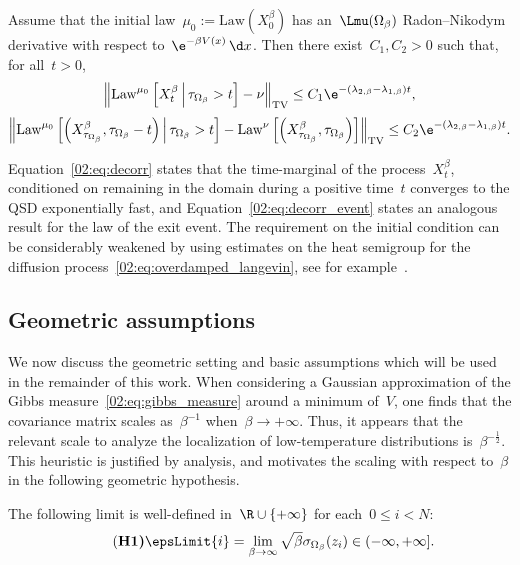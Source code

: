     \begin{proposition}
        \label{02:prop:decorr}
        Assume that the initial law~$\mu_0 := \mathrm{Law}(X^\beta_0)$ has an~$\Lmu(\Omega_\beta)$ Radon--Nikodym derivative with respect to~$\e^{-\beta V(x)}\,\d x$. Then there exist~$C_1,C_2>0$ such that, for all~$t>0$,
        \begin{equation}
            \label{02:eq:decorr}
            \left\|\mathrm{Law}^{\mu_0}\left[X_t^\beta\,\middle|\,\tau_{\Omega_\beta}>t\right] -\nu\right\|_{\mathrm{TV}} \leq C_1 \e^{-(\lambda_{2,\beta}-\lambda_{1,\beta})t},
        \end{equation}
        \begin{equation}
            \label{02:eq:decorr_event}
            \left\|\mathrm{Law}^{\mu_0}\left[\left(X^\beta_{\tau_{\Omega_\beta}},\tau_{\Omega_{\beta}}-t\right)\,\middle|\,\tau_{\Omega_\beta}>t\right] -\mathrm{Law}^\nu\left[\left(X^\beta_{\tau_{\Omega_\beta}},\tau_{\Omega_\beta}\right)\right]\right\|_{\mathrm{TV}} \leq C_2 \e^{-(\lambda_{2,\beta}-\lambda_{1,\beta})t}.
        \end{equation}
    \end{proposition}
    Equation~\eqref{02:eq:decorr} states that the time-marginal of the process~$X_t^\beta$, conditioned on remaining in the domain during a positive time~$t$ converges to the QSD exponentially fast, and Equation~\eqref{02:eq:decorr_event} states an analogous result for the law of the exit event.
    The requirement on the initial condition can be considerably weakened by using estimates on the heat semigroup for the diffusion process~\eqref{02:eq:overdamped_langevin}, see for example~\cite{SL13}.    
    \subsection{Geometric assumptions}
    \label{02:subsec:geometric_assumptions}
    We now discuss the geometric setting and basic assumptions which will be used in the remainder of this work.
    When considering a Gaussian approximation of the Gibbs measure~\eqref{02:eq:gibbs_measure} around a minimum of~$V$, one finds that the covariance matrix scales as~$\beta^{-1}$ when~$\beta\to+\infty$. Thus, it appears that the relevant scale to analyze the localization of low-temperature distributions is~$\beta^{-\frac 12}$.
    This heuristic is justified by analysis, and motivates the scaling with respect to~$\beta$ in the following geometric hypothesis.

    \begin{hypothesis}
    The following limit is well-defined in~$\R\cup\{+\infty\}$ for each~$0\leq i < N$:
    \begin{equation}
        \label{02:hyp:alpha_exists}
        \tag{\bf H1}
        \epsLimit{i} =\underset{\beta\to\infty}{\lim}\, \sqrt\beta\sigma_{\Omega_\beta}(z_i) \in (-\infty,+\infty].
    \end{equation}
    \end{hypothesis}

